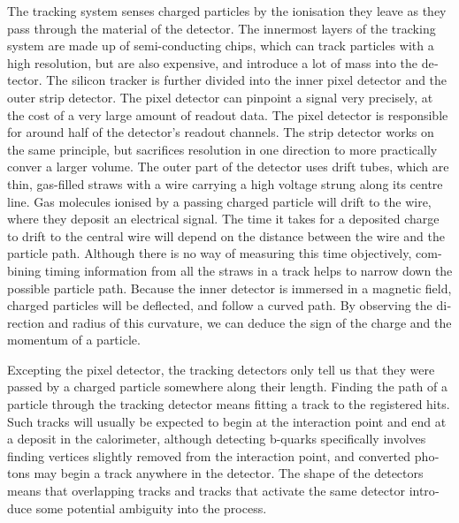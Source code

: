 \begin{english}
The tracking system senses charged particles by the ionisation they leave as they pass through the material of the detector. The innermost layers of the tracking system are made up of semi-conducting chips, which can track particles with a high resolution, but are also expensive, and introduce a lot of mass into the detector. The silicon tracker is further divided into the inner pixel detector and the outer strip detector. The pixel detector can pinpoint a signal very precisely, at the cost of a very large amount of readout data. The pixel detector is responsible for around half of the detector's readout channels. The strip detector works on the same principle, but sacrifices resolution in one direction to more practically conver a larger volume. The outer part of the detector uses drift tubes, which are thin, gas-filled straws with a wire carrying a high voltage strung along its centre line. Gas molecules ionised by a passing charged particle will drift to the wire, where they deposit an electrical signal. The time it takes for a deposited charge to drift to the central wire will depend on the distance between the wire and the particle path. Although there is no way of measuring this time objectively, combining timing information from all the straws in a track helps to narrow down the possible particle path. Because the inner detector is immersed in a magnetic field, charged particles will be deflected, and follow a curved path. By observing the direction and radius of this curvature, we can deduce the sign of the charge and the momentum of a particle.

Excepting the pixel detector, the tracking detectors only tell us that they were passed by a charged particle somewhere along their length. Finding the path of a particle through the tracking detector means fitting a track to the registered hits. Such tracks will usually be expected to begin at the interaction point and end at a deposit in the calorimeter, although detecting b-quarks specifically involves finding vertices slightly removed from the interaction point, and converted photons may begin a track anywhere in the detector. The shape of the detectors means that overlapping tracks and tracks that activate the same detector introduce some potential ambiguity into the process.


\end{english}
